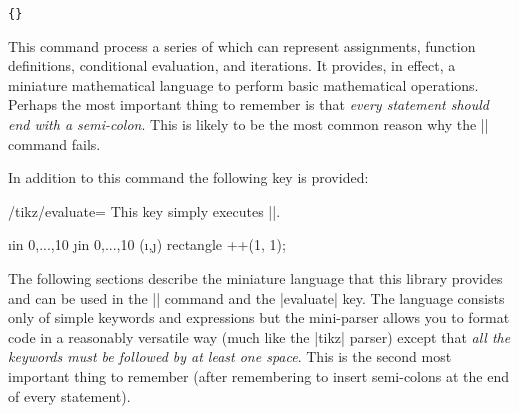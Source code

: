 \begin{command}{\tikzmath\texttt{\{}\texttt{\}}}

	This command process  a series of  which can 
	represent assignments, function definitions, conditional evaluation,
	and iterations. It provides, in effect,  a miniature mathematical
	language to perform basic mathematical operations.
	Perhaps the most important thing to remember is that \emph{every 
	statement should end with a semi-colon}. This is
	likely to be the most common reason why the |\tikzmath| command fails.

\begin{codeexample}[]
\end{codeexample}

\end{command}

In addition to this command the following key is provided:
	
\begin{key}{/tikz/evaluate={}}
	This key simply executes ||.
	
\begin{codeexample}[]
\tikz[x=0.25cm,y=0.25cm,
  evaluate={
    int \i, \j;
    for \i in {0,...,10}{
      for \j in {0,...,10}{
        \a{\i,\j} = (\i+\j)*5;
      };
    };
  }
]
\foreach \i in {0,...,10}
  \foreach \j in {0,...,10}
      (\i,\j) rectangle ++(1, 1);

\end{codeexample}


\end{key}


	The following sections describe the miniature language that this
	library provides and 	can be used in the |\tikzmath| command and the |evaluate| key.
	The language consists only of simple keywords and expressions but
	the mini-parser allows you to format code in a reasonably versatile
	way (much like the |tikz| parser) except that 
	\emph{all the keywords must be followed by at least one space}.
	This is the second most important thing to remember (after 
	remembering to insert semi-colons at the end of every statement).


